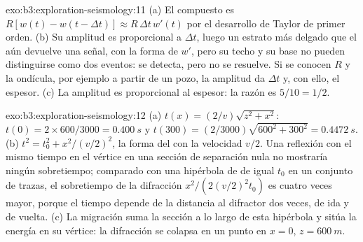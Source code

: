\begin{solution}{exo:b3:exploration-seismology:11}
(a) El compuesto es $R[w(t) - w(t - \Delta t)] \approx R\,\Delta t\,w'(t)$ por
el desarrollo de Taylor de primer orden. (b) Su amplitud es proporcional a
$\Delta t$, luego un estrato más delgado que el  aún devuelve una señal,
con la forma de $w'$, pero su techo y su base no pueden distinguirse como dos eventos: se
detecta, pero no se resuelve. Si se conocen $R$ y la ondícula, por ejemplo a partir de un pozo,
la amplitud da $\Delta t$ y, con ello, el espesor. (c) La amplitud es
proporcional al espesor: la razón es $5/10 = 1/2$.
\end{solution}

\begin{solution}{exo:b3:exploration-seismology:12}
(a) $t(x) = (2/v)\sqrt{z^2 + x^2}$: $t(0) = 2\times600/3000 = \qty{0.400}{s}$ y
$t(300) = (2/3000)\sqrt{600^2 + 300^2} = \qty{0.4472}{s}$. (b) $t^2 = t_0^2 +
x^2/(v/2)^2$, la forma del  con la velocidad $v/2$. Una reflexión con el mismo tiempo en el vértice
en una sección de separación nula no mostraría ningún sobretiempo; comparado con una
hipérbola de  de igual $t_0$ en un conjunto de trazas, el sobretiempo de la difracción
$x^2/(2(v/2)^2t_0)$ es cuatro veces mayor, porque el tiempo depende de la
distancia al difractor dos veces, de ida y de vuelta. (c) La migración suma la
sección a lo largo de esta hipérbola y sitúa la energía en su vértice: la difracción
se colapsa en un punto en $x = 0$, $z = \qty{600}{m}$.
\end{solution}


